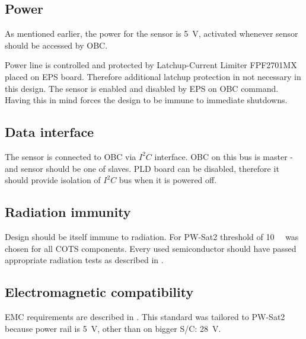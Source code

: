 \subsection{Power}
	As mentioned earlier, the power for the sensor is \SI{+5}{\volt}, activated whenever sensor should be accessed by OBC. 
	
	Power line is controlled and protected by Latchup-Current Limiter FPF2701MX placed on EPS board. Therefore additional latchup protection in not necessary in this design. The sensor is enabled and disabled by EPS on OBC command. Having this in mind forces the design to be immune to immediate shutdowns. 
	
\subsection{Data interface}
	The sensor is connected to OBC via $I^2C$ interface. OBC on this bus is master - and sensor should be one of slaves. PLD board can be disabled, therefore it should provide isolation of $I^2C$ bus when it is powered off.
	
\subsection{Radiation immunity}
	Design should be itself immune to radiation. For PW-Sat2 threshold of \SI{10}{\kilo\rad} was chosen for all COTS components. Every used semiconductor should have passed appropriate radiation tests as described in \cite{ESCIES_TID_test_method}.

\subsection{Electromagnetic compatibility}
	EMC requirements are described in \cite{ECSS_E_ST_20_07C}. This standard was tailored to PW-Sat2 because power rail is \SI{+5}{\volt}, other than on bigger S/C: \SI{+28}{\volt}.
	

